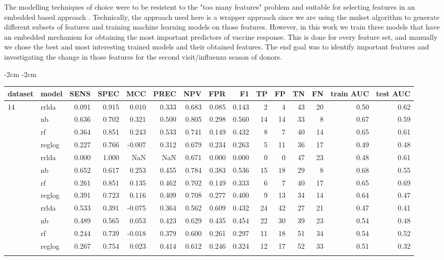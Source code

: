 The modelling techniques of choice were to be resistent to the "too many
features" problem and suitable for selecting features in an embedded based
approach \citep{hiraReviewFeatureSelection2015}. Technically, the approach used
here is a wrapper approach since we are using the mulset algorithm to generate
different subsets of features and training machine learning models on those
features. However, in this work we train three models that have an embedded
mechanism for obtaining the most important predictors of vaccine response. This
is done for every feature set, and manually we chose the best and most
interesting trained models and their obtained features. The end goal was to
identify important features and investigating the change in those features for the
second visit/influenza season of donors.

\begin{table}
\addtolength{\leftskip} {-2cm} %
\addtolength{\rightskip} {-2cm} %
\begin{tabular}{llrrrrrrrrrrrrr}
\toprule{}
dataset &model & SENS & SPEC & MCC & PREC & NPV & FPR & F1 & TP & FP & TN & FN & train AUC & test AUC\\
\midrule{}
14    & rrlda & 0.091 & 0.915 & 0.010 & 0.333 & 0.683 & 0.085 & 0.143 & 2 & 4 & 43 & 20 & 0.50 & 0.62\\
    & nb & 0.636 & 0.702 & 0.321 & 0.500 & 0.805 & 0.298 & 0.560 & 14 & 14 & 33 & 8 & 0.67 & 0.59\\
    & rf & 0.364 & 0.851 & 0.243 & 0.533 & 0.741 & 0.149 & 0.432 & 8 & 7 & 40 & 14 & 0.65 & 0.61\\
    & reglog & 0.227 & 0.766 & -0.007 & 0.312 & 0.679 & 0.234 & 0.263 & 5 & 11 & 36 & 17 & 0.49 & 0.48\\
\addlinespace
16    & rrlda & 0.000 & 1.000 & NaN & NaN & 0.671 & 0.000 & 0.000 & 0 & 0 & 47 & 23 & 0.48 & 0.61\\
    & nb & 0.652 & 0.617 & 0.253 & 0.455 & 0.784 & 0.383 & 0.536 & 15 & 18 & 29 & 8 & 0.68 & 0.55\\
    & rf & 0.261 & 0.851 & 0.135 & 0.462 & 0.702 & 0.149 & 0.333 & 6 & 7 & 40 & 17 & 0.65 & 0.69\\
    & reglog & 0.391 & 0.723 & 0.116 & 0.409 & 0.708 & 0.277 & 0.400 & 9 & 13 & 34 & 14 & 0.64 & 0.47\\
\addlinespace
19    & rrlda & 0.533 & 0.391 & -0.075 & 0.364 & 0.562 & 0.609 & 0.432 & 24 & 42 & 27 & 21 & 0.47 & 0.41\\
    & nb & 0.489 & 0.565 & 0.053 & 0.423 & 0.629 & 0.435 & 0.454 & 22 & 30 & 39 & 23 & 0.54 & 0.48\\
    & rf & 0.244 & 0.739 & -0.018 & 0.379 & 0.600 & 0.261 & 0.297 & 11 & 18 & 51 & 34 & 0.54 & 0.52\\
    & reglog & 0.267 & 0.754 & 0.023 & 0.414 & 0.612 & 0.246 & 0.324 & 12 & 17 & 52 & 33 & 0.51 & 0.32\\
\bottomrule{}
\end{tabular}

\end{table}


